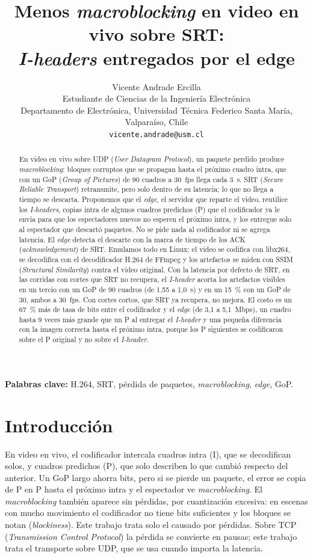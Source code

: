 \documentclass[10pt,twocolumn,letterpaper]{article}
\title{\Large Menos \emph{macroblocking} en video en vivo sobre SRT:\\ \emph{I-headers} entregados por el edge}
\author{Vicente Andrade Ercilla\\
\small Estudiante de Ciencias de la Ingeniería Electrónica\\
\small Departamento de Electrónica, Universidad Técnica Federico Santa María, Valparaíso, Chile\\
\small \texttt{vicente.andrade@usm.cl}}
\date{}
\begin{document}
\maketitle

\begin{abstract}
\noindent En video en vivo sobre UDP (\emph{User Datagram Protocol}), un paquete perdido produce \emph{macroblocking}: bloques corruptos que se propagan hasta el próximo cuadro intra, que con un GoP (\emph{Group of Pictures}) de 90 cuadros a 30~fps llega cada 3~s. SRT (\emph{Secure Reliable Transport}) retransmite, pero solo dentro de su latencia; lo que no llega a tiempo se descarta. Proponemos que el \emph{edge}, el servidor que reparte el video, reutilice los \emph{I-headers}, copias intra de algunos cuadros predichos (P) que el codificador ya le envía para que los espectadores nuevos no esperen el próximo intra, y los entregue solo al espectador que descartó paquetes. No se pide nada al codificador ni se agrega latencia. El \emph{edge} detecta el descarte con la marca de tiempo de los ACK (\emph{acknowledgement}) de SRT. Emulamos todo en Linux: el video se codifica con libx264, se decodifica con el decodificador H.264 de FFmpeg y los artefactos se miden con SSIM (\emph{Structural Similarity}) contra el video original. Con la latencia por defecto de SRT, en las corridas con cortes que SRT no recupera, el \emph{I-header} acorta los artefactos visibles en un tercio con un GoP de 90 cuadros (de 1,55 a 1,0~s) y en un 15~\% con un GoP de 30, ambos a 30~fps. Con cortes cortos, que SRT ya recupera, no mejora. El costo es un 67~\% más de tasa de bits entre el codificador y el \emph{edge} (de 3,1 a 5,1~Mbps), un cuadro hasta 9 veces más grande que un P al entregar el \emph{I-header} y una pequeña diferencia con la imagen correcta hasta el próximo intra, porque los P siguientes se codificaron sobre el P original y no sobre el \emph{I-header}.
\end{abstract}

\noindent\textbf{\small Palabras clave:} \small H.264, SRT, pérdida de paquetes, \emph{macroblocking}, \emph{edge}, GoP.
\normalsize

\section{Introducción}

En video en vivo, el codificador intercala cuadros intra (I), que se decodifican solos, y cuadros predichos (P), que solo describen lo que cambió respecto del anterior. Un GoP largo ahorra bits, pero si se pierde un paquete, el error se copia de P en P hasta el próximo intra y el espectador ve \emph{macroblocking}. El \emph{macroblocking} también aparece sin pérdidas, por cuantización excesiva: en escenas con mucho movimiento el codificador no tiene bits suficientes y los bloques se notan (\emph{blockiness}). Este trabajo trata solo el causado por pérdidas. Sobre TCP (\emph{Transmission Control Protocol}) la pérdida se convierte en pausas; este trabajo trata el transporte sobre UDP, que se usa cuando importa la latencia.
\end{document}
